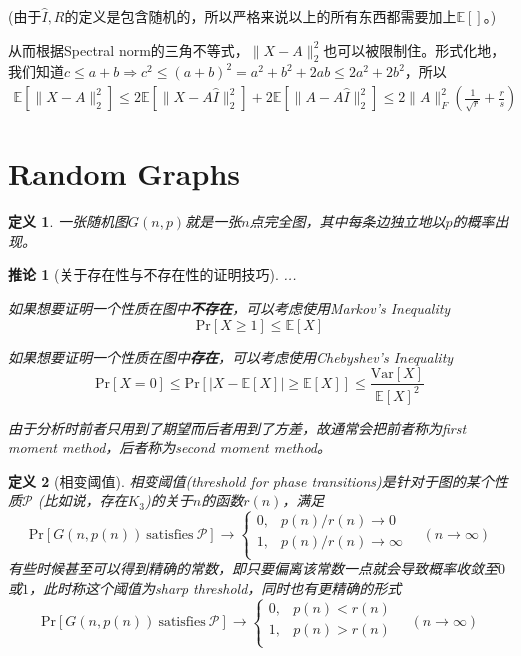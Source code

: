 \documentclass[8pt]{article}
\theoremstyle{compact}
\newtheorem{definition}{定义}
\newtheorem{corollary}{推论}
\def\le{\leqslant}
\def\ge{\geqslant}
\def\Pr#1{\text{Pr}\left[{#1}\right]}
\def\E#1{\mathbb{E}\left[{#1}\right]}
\def\Var#1{\text{Var}\left[{#1}\right]}
\begin{document}
(由于$\hat{I}, R$的定义是包含随机的，所以严格来说以上的所有东西都需要加上$\E{}$。)

从而根据Spectral norm的三角不等式，$\|X - A\|_2^2$也可以被限制住。形式化地，我们知道$c \le a + b \Rightarrow c^2 \le (a + b)^2 = a^2 + b^2 + 2ab \le 2a^2 + 2b^2$，所以
\begin{equation}
\begin{split}
\E{\|X - A\|_2^2} \le 2\E{\|X - A\hat{I}\|_2^2} + 2\E{\|A - A\hat{I}\|_2^2} \le 2\|A\|_F^2\left(\frac{1}{\sqrt r} + \frac{r}{s}\right)
\end{split}
\end{equation}
\newpage
\section{Random Graphs}
\begin{definition}
	一张随机图$G(n, p)$就是一张$n$点完全图，其中每条边独立地以$p$的概率出现。
\end{definition}
\begin{corollary}[关于存在性与不存在性的证明技巧]{\color{white}...}
	
	如果想要证明一个性质在图中\textbf{不存在}，可以考虑使用Markov's Inequality
	\begin{equation}
		\Pr{X \ge 1} \le \E{X}
	\end{equation}
	
	如果想要证明一个性质在图中\textbf{存在}，可以考虑使用Chebyshev's Inequality
	\begin{equation}
		\Pr{X = 0} \le \Pr{|X - \E{X}| \ge \E{X}} \le \frac{\Var{X}}{\E{X}^2}
	\end{equation}
	
	由于分析时前者只用到了期望而后者用到了方差，故通常会把前者称为first moment method，后者称为second moment method。
\end{corollary}

\begin{definition}[相变阈值]
	相变阈值(threshold for phase transitions)是针对于图的某个性质$\mathcal P$ (比如说，存在$K_3$)的关于$n$的函数$r(n)$，满足
	\begin{equation}
	\Pr{G(n, p(n))\ \text{satisfies}\ \mathcal P} \to \begin{cases}
	0, & p(n) / r(n) \to 0\\
	1, & p(n) / r(n) \to \infty\\
	\end{cases}\quad(n \to \infty)
	\end{equation}
	有些时候甚至可以得到精确的常数，即只要偏离该常数一点就会导致概率收敛至$0$或$1$，此时称这个阈值为sharp threshold，同时也有更精确的形式
	\begin{equation}
	\Pr{G(n, p(n))\ \text{satisfies}\ \mathcal P} \to \begin{cases}
	0, & p(n) < r(n) \\
	1, & p(n) > r(n) \\
	\end{cases}\quad(n \to \infty)
	\end{equation}
\end{definition}
\end{document}

